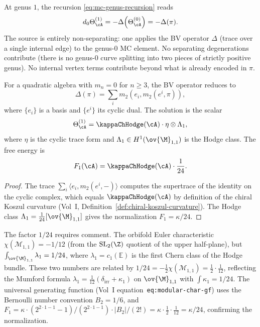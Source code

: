 \begin{computation}
At genus $1$, the recursion \eqref{eq:mc-genus-recursion} reads
\[
d_0 \Theta_\cA^{(1)}
= -\Delta\!\left(\Theta_\cA^{(0)}\right)
= -\Delta(\pi).
\]
The source is entirely non-separating: one applies the BV operator $\Delta$
(trace over a single internal edge) to the genus-$0$ MC element. No
separating degenerations contribute (there is no genus-$0$ curve splitting
into two pieces of strictly positive genus). No internal vertex terms
contribute beyond what is already encoded in $\pi$.

For a quadratic algebra with $m_n = 0$ for $n \geq 3$, the BV operator reduces to
\[
\Delta(\pi) = \sum_{i} m_2(e_i, m_2(e^i, \pi)),
\]
where $\{e_i\}$ is a basis and $\{e^i\}$ its cyclic dual. The solution is the
scalar
\begin{equation}
\Theta_\cA^{(1)} = \kappaChHodge(\cA) \cdot \eta \otimes \Lambda_1,
\end{equation}
where $\eta$ is the cyclic trace form and $\Lambda_1 \in H^1(\ov{\M}_{1,1})$ is
the Hodge class. The free energy is
\begin{equation}
F_1(\cA) = \kappaChHodge(\cA) \cdot \frac{1}{24}.
\end{equation}
\end{computation}

\begin{proof}
The trace $\sum_i \langle e_i, m_2(e^i, -) \rangle$ computes the supertrace
of the identity on the cyclic complex, which equals $\kappaChHodge(\cA)$ by definition
of the chiral Koszul curvature (Vol~I, Definition~\ref*{def:chiral-koszul-curvature}).
The Hodge class $\Lambda_1 = \frac{1}{24}[\ov{\M}_{1,1}]$ gives the
normalization $F_1 = \kappa/24$.
\end{proof}

\begin{remark}
The factor $1/24$ requires comment. The orbifold Euler characteristic
$\chi(\mathcal{M}_{1,1}) = -1/12$ (from the $\mathrm{SL}_2(\Z)$ quotient
of the upper half-plane), but $\int_{\ov{\M}_{1,1}} \lambda_1 = 1/24$, where
$\lambda_1 = c_1(\mathbb{E})$ is the first Chern class of the Hodge bundle.
These two numbers are related by $1/24 = -\frac{1}{2}\chi(\mathcal{M}_{1,1})
= \frac{1}{2} \cdot \frac{1}{12}$, reflecting the Mumford formula
$\lambda_1 = \frac{1}{12}(\delta_{\mathrm{irr}} + \kappa_1)$ on
$\ov{\M}_{1,1}$ with $\int \kappa_1 = 1/24$. The universal generating
function (Vol~I equation~\texttt{eq:modular-char-gf}) uses the Bernoulli
number convention $B_2 = 1/6$, and $F_1 = \kappa \cdot
(2^{2\cdot 1 - 1} - 1)/(2^{2\cdot 1 - 1}) \cdot |B_2|/(2!) =
\kappa \cdot \frac{1}{2} \cdot \frac{1}{12} = \kappa/24$, confirming the
normalization.
\end{remark}

